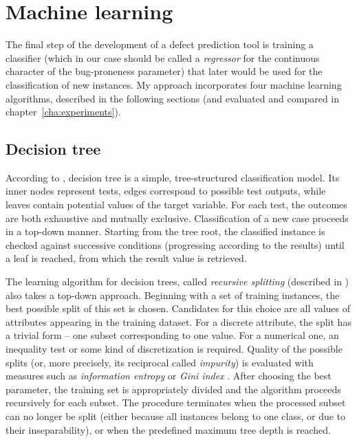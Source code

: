 \documentclass{pracamgr}
\begin{document}
\section{Machine learning}
\label{sec:machine_learning}
The final step of the development of a defect prediction tool is training a classifier (which in our case should be called a \emph{regressor} for the continuous character of the bug-proneness parameter) that later would be used for the classification of new instances. My approach incorporates four machine learning algorithms, described in the following sections (and evaluated and compared in chapter~\ref{cha:experiments}).

\subsection{Decision tree}
\label{sec:decision_tree}
According to \cite[p. 263]{encyclopedia}, decision tree is a simple, tree-structured classification model. Its inner nodes represent tests, edges correspond to possible test outputs, while leaves contain potential values of the target variable. For each test, the outcomes are both exhaustive and mutually exclusive. Classification of a new case proceeds in a top-down manner. Starting from the tree root, the classified instance is checked against successive conditions (progressing according to the results) until a leaf is reached, from which the result value is retrieved.

The learning algorithm for decision trees, called \emph{recursive splitting} (described in \cite[p.~264]{encyclopedia}) also takes a top-down approach. Beginning with a set of training instances, the best possible split of this set is chosen. Candidates for this choice are all values of attributes appearing in the training dataset. For a discrete attribute, the split has a trivial form -- one subset corresponding to one value. For a numerical one, an inequality test or some kind of discretization is required. Quality of the possible splits (or, more precisely, its reciprocal called \emph{impurity}) is evaluated with measures such as \emph{information entropy} \cite{Shannon} or \emph{Gini index} \cite{Gini}. After choosing the best parameter, the training set is appropriately divided and the algorithm proceeds recursively for each subset. The procedure terminates when the processed subset can no longer be split (either because all instances belong to one class, or due to their inseparability), or when the predefined maximum tree depth is reached.
\end{document}
